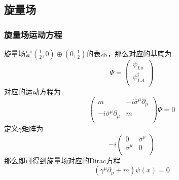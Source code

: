 \documentclass[aspectratio=1610,12pt]{beamer}
\begin{document}
\subsection{旋量场}
\begin{frame}
    \frametitle{旋量场运动方程}
    旋量场是$(\frac{1}{2},0)\oplus (0,\frac{1}{2})$的表示，那么对应的基底为
    \begin{equation}
        \Psi=\left(\begin{array}{c}
            \psi_{La}\\
            \psi^{\dagger}_{LA}\\
        \end{array}\right)
    \end{equation}
    对应的运动方程为
    \begin{equation}
        \left(\begin{array}{cc}
            m&-i\overline{\sigma}^\mu\partial_\mu\\
            -i\overline{\sigma}^\mu\partial_\mu&m\\
        \end{array}\right)\Psi=0
    \end{equation}
    定义$\gamma$矩阵为
    \begin{equation}
        -i\left(\begin{array}{cc}
            0&\overline{\sigma}^\mu\\
            \overline{\sigma}^\mu&0\\
        \end{array}\right)
    \end{equation}
    那么即可得到旋量场对应的Dirac方程
    \begin{equation}
        (\gamma^\mu\partial_\mu+m)\psi(x)=0
    \end{equation}
\end{frame}
\end{document}
